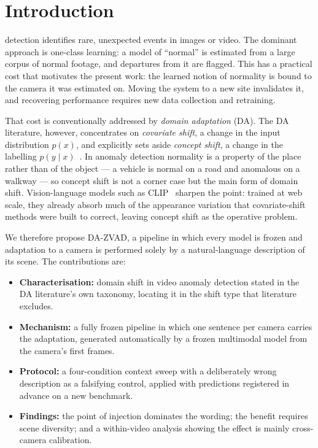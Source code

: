 \documentclass[conference]{IEEEtran}
\begin{document}
\section{Introduction}

 detection identifies rare, unexpected events in images
or video. The dominant approach is one-class learning: a model of ``normal'' is
estimated from a large corpus of normal footage, and departures from it are
flagged. This has a practical cost that motivates the present work: the learned
notion of normality is bound to the camera it was estimated on. Moving the
system to a new site invalidates it, and recovering performance requires new
data collection and retraining.

That cost is conventionally addressed by \emph{domain adaptation} (DA). The DA
literature, however, concentrates on \emph{covariate shift}, a change in the
input distribution $p(x)$, and explicitly sets aside \emph{concept shift}, a
change in the labelling $p(y\mid x)$~\cite{liu2022deep}. In anomaly detection
normality is a property of the place rather than of the object --- a vehicle is
normal on a road and anomalous on a walkway --- so concept shift is not a corner
case but the main form of domain shift. Vision-language models such as
CLIP~\cite{radford2021clip} sharpen the point: trained at web scale, they
already absorb much of the appearance variation that covariate-shift methods
were built to correct, leaving concept shift as the operative problem.

We therefore propose DA-ZVAD, a pipeline in which every model is frozen and
adaptation to a camera is performed solely by a natural-language description of
its scene. The contributions are:
\begin{itemize}
  \item \textbf{Characterisation:} domain shift in video anomaly detection
        stated in the DA literature's own taxonomy, locating it in the shift
        type that literature excludes.
  \item \textbf{Mechanism:} a fully frozen pipeline in which one sentence per
        camera carries the adaptation, generated automatically by a frozen
        multimodal model from the camera's first frames.
  \item \textbf{Protocol:} a four-condition context sweep with a deliberately
        wrong description as a falsifying control, applied with predictions
        registered in advance on a new benchmark.
  \item \textbf{Findings:} the point of injection dominates the wording;
        the benefit requires scene diversity; and a within-video analysis
        showing the effect is mainly cross-camera calibration.
\end{itemize}
\end{document}
